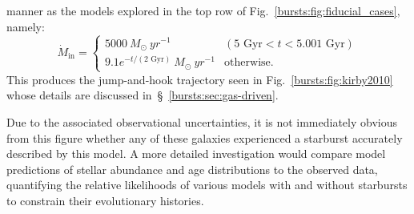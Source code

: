 \documentclass[main.tex]{subfiles}
\begin{document}
manner as the models explored in the top row of Fig.~\ref{bursts:fig:fiducial_cases}, 
namely: 
\begin{equation} 
\dot{M}_\text{in} = \begin{cases} 
5000\ M_\odot\ yr^{-1} & (5\text{ Gyr} < t < 5.001\text{ Gyr}) \\ 
9.1e^{-t / (\text{2 Gyr})}\ M_\odot\ yr^{-1} & \text{otherwise}. 
\end{cases} 
\label{bursts:eq:kirby2010_burst_model}
\end{equation} 
This produces the jump-and-hook trajectory seen in Fig.~\ref{bursts:fig:kirby2010} 
whose details are discussed in~\S~\ref{bursts:sec:gas-driven}. 
\par 
Due to the associated observational uncertainties, it is not immediately 
obvious from this figure whether any of these galaxies experienced a starburst 
accurately described by this model. A more detailed investigation would 
compare model predictions of stellar abundance and age distributions to the 
observed data, quantifying the relative likelihoods of various models with and 
without starbursts to constrain their evolutionary histories. 
\end{document}
